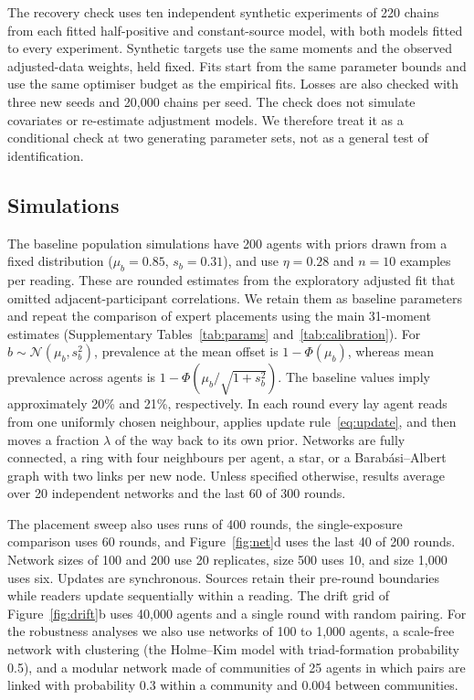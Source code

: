 \documentclass[11pt]{article}
\begin{document}
The recovery check uses ten independent synthetic experiments of 220 chains from each fitted half-positive and constant-source model, with both models fitted to every experiment. Synthetic targets use the same moments and the observed adjusted-data weights, held fixed. Fits start from the same parameter bounds and use the same optimiser budget as the empirical fits. Losses are also checked with three new seeds and 20{,}000 chains per seed. The check does not simulate covariates or re-estimate adjustment models. We therefore treat it as a conditional check at two generating parameter sets, not as a general test of identification.

\subsection{Simulations}

The baseline population simulations have 200 agents with priors drawn from a fixed distribution ($\mu_b = 0.85$, $s_b = 0.31$), and use $\eta = 0.28$ and $n = 10$ examples per reading. These are rounded estimates from the exploratory adjusted fit that omitted adjacent-participant correlations. We retain them as baseline parameters and repeat the comparison of expert placements using the main 31-moment estimates (Supplementary Tables~\ref{tab:params} and~\ref{tab:calibration}). For $b\sim\mathcal{N}(\mu_b,s_b^2)$, prevalence at the mean offset is $1-\Phi(\mu_b)$, whereas mean prevalence across agents is $1-\Phi(\mu_b/\sqrt{1+s_b^2})$. The baseline values imply approximately 20\% and 21\%, respectively. In each round every lay agent reads from one uniformly chosen neighbour, applies update rule~\eqref{eq:update}, and then moves a fraction $\lambda$ of the way back to its own prior. Networks are fully connected, a ring with four neighbours per agent, a star, or a Barab\'asi--Albert graph with two links per new node. Unless specified otherwise, results average over 20 independent networks and the last 60 of 300 rounds.

The placement sweep also uses runs of 400 rounds, the single-exposure comparison uses 60 rounds, and Figure~\ref{fig:net}d uses the last 40 of 200 rounds. Network sizes of 100 and 200 use 20 replicates, size 500 uses 10, and size 1{,}000 uses six. Updates are synchronous. Sources retain their pre-round boundaries while readers update sequentially within a reading. The drift grid of Figure~\ref{fig:drift}b uses 40{,}000 agents and a single round with random pairing. For the robustness analyses we also use networks of 100 to 1{,}000 agents, a scale-free network with clustering (the Holme--Kim model with triad-formation probability 0.5), and a modular network made of communities of 25 agents in which pairs are linked with probability 0.3 within a community and 0.004 between communities.
\end{document}

